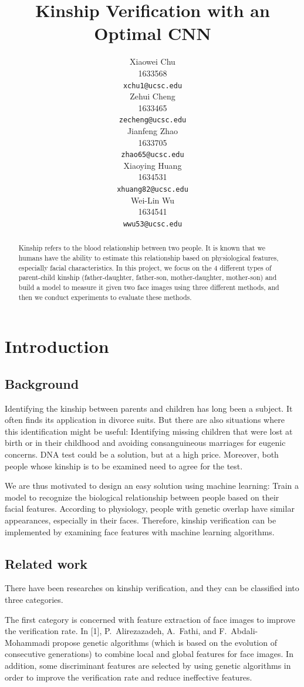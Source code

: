 \documentclass{article}
\title{Kinship Verification with an Optimal CNN}
\author{
  Xiaowei Chu \\
  1633568 \\
  \texttt{xchu1@ucsc.edu} \\
  \And
  Zehui Cheng \\
  1633465 \\
  \texttt{zecheng@ucsc.edu} \\
  \And
  Jianfeng Zhao \\
  1633705 \\
  \texttt{zhao65@ucsc.edu} \\
  \And
  Xiaoying Huang \\
  1634531 \\
  \texttt{xhuang82@ucsc.edu} \\
  \AND
  Wei-Lin Wu \\
  1634541 \\
  \texttt{wwu53@ucsc.edu} \\
}
\begin{document}

\maketitle

\begin{abstract}
Kinship refers to the blood relationship between two people. It is known that we humans have the ability to estimate this relationship based on physiological features, especially facial characteristics. In this project, we focus on the 4 different types of parent-child kinship (father-daughter, father-son, mother-daughter, mother-son) and build a model to measure it given two face images using three different methods, and then we conduct experiments to evaluate these methods.
\end{abstract}

\section{Introduction}
\subsection{Background}
Identifying the kinship between parents and children has long been a subject. It often finds its application in divorce suits. But there are also situations where this identification might be useful: Identifying missing children that were lost at birth or in their childhood and avoiding consanguineous marriages for eugenic concerns. DNA test could be a solution, but at a high price. Moreover, both people whose kinship is to be examined need to agree for the test.

We are thus motivated to design an easy solution using machine learning: Train a model to recognize the biological relationship between people based on their facial features. According to physiology, people with genetic overlap have similar appearances, especially in their faces. Therefore, kinship verification can be implemented by examining face features with machine learning algorithms.

\subsection{Related work}
There have been researches on kinship verification, and they can be classified into three categories.

The first category is concerned with feature extraction of face images to improve the verification rate. In [1], P.\ Alirezazadeh, A.\ Fathi, and F.\ Abdali-Mohammadi propose genetic algorithms (which is based on the evolution of consecutive generations) to combine local and global features for face images. In addition, some discriminant features are selected by using genetic algorithms in order to improve the verification rate and reduce ineffective features.
\end{document}
